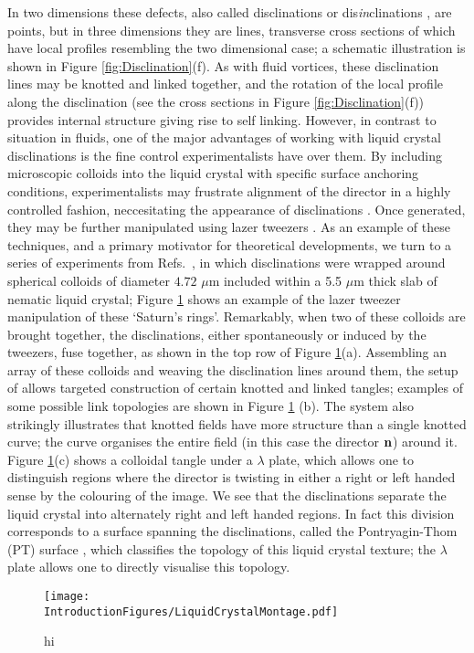 In two dimensions these defects, also called disclinations or dis\emph{in}clinations \cite{Frank}, are points, but in three dimensions they are lines, transverse cross sections of which have local profiles resembling the two dimensional case; a schematic illustration is shown in Figure \ref{fig:Disclination}(f). As with fluid vortices, these disclination lines may be knotted and linked together, and the rotation of the local profile along the disclination (see the cross sections in Figure \ref{fig:Disclination}(f)) provides internal structure giving rise to self linking. However, in contrast to situation in fluids, one of the major advantages of working with liquid crystal disclinations is the fine control experimentalists have over them. By including microscopic colloids into the liquid crystal with specific surface anchoring conditions, experimentalists may frustrate alignment of the director in a highly controlled fashion, neccesitating the appearance of disclinations \cite{}. Once generated, they may be further manipulated using lazer tweezers \citep{Tkalec2011}. As an example of these techniques, and a primary motivator for theoretical developments, we turn to a series of experiments from Refs.~\citep{Tkalec2011,Tasinkevych2014,Copar2015}, in which disclinations were wrapped around spherical colloids of diameter $4.72$ $\mu$m included within a 5.5 $\mu$m thick slab of nematic liquid crystal; Figure \ref{fig:KnottedLiquidCrystal} shows an example of the lazer tweezer manipulation of these `Saturn's rings'. Remarkably, when two of these colloids are brought together, the disclinations, either spontaneously or induced by the tweezers, fuse together, as shown in the top row of Figure \ref{fig:KnottedLiquidCrystal}(a). Assembling an array of these colloids and weaving the disclination lines around them, the setup of \citep{Tkalec2011,Tasinkevych2014,Copar2015} allows targeted construction of certain knotted and linked tangles; examples of some possible link topologies are shown in Figure \ref{fig:KnottedLiquidCrystal} (b). The system also strikingly illustrates that knotted fields have more structure than a single knotted curve; the curve organises the entire field (in this case the director $\bf n$) around it. Figure \ref{fig:KnottedLiquidCrystal}(c) shows a colloidal tangle under a $\lambda$ plate, which allows one to distinguish regions where the director is twisting in either a right or left handed sense by the colouring of the image. We see that the disclinations separate the liquid crystal into alternately right and left handed regions. In fact this division corresponds to a surface spanning the disclinations, called the Pontryagin-Thom (PT) surface \cite{Chen}, which classifies the topology of this liquid crystal texture; the $\lambda$ plate allows one to directly visualise this topology.
\begin{figure}[htbp]
\centering
\texttt{[image: \\IntroductionFigures/LiquidCrystalMontage.pdf]}
\caption{hi }
\label{fig:KnottedLiquidCrystal}
\end{figure}
